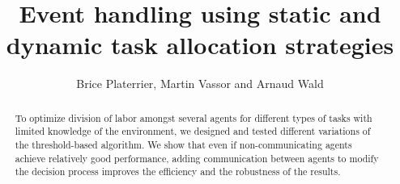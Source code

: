 \documentclass[a4paper, 10pt, conference]{ieeeconf}      %
\title{\LARGE \bf
Event handling using static and dynamic task allocation strategies
}
\author{Brice Platerrier, Martin Vassor and Arnaud Wald}
\begin{document}
\maketitle
\thispagestyle{empty}
\pagestyle{empty}

\begin{abstract}

To optimize division of labor amongst several agents for different types of tasks with limited knowledge of the environment, we designed and tested different variations of the threshold-based algorithm. We show that even if non-communicating agents achieve relatively good performance, adding communication between agents to modify the decision process improves the efficiency and the robustness of the results.

\end{abstract}











\printbibliography
\end{document}
